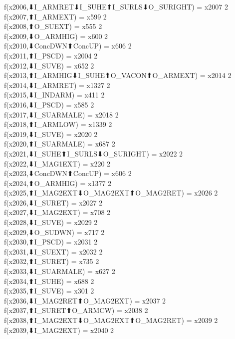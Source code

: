 f(x2006,⬇I_ARMRET⬇I_SUHE⬆I_SURLS⬇O_SURIGHT) = x2007 {2} \\
f(x2007,⬆I_ARMEXT) = x599 {2} \\
f(x2008,⬆O_SUEXT) = x555 {2} \\
f(x2009,⬇O_ARMHIG) = x600 {2} \\
f(x2010,⬇ConcDWN⬆ConcUP) = x606 {2} \\
f(x2011,⬆I_PSCD) = x2004 {2} \\
f(x2012,⬇I_SUVE) = x652 {2} \\
f(x2013,⬆I_ARMHIG⬇I_SUHE⬆O_VACON⬆O_ARMEXT) = x2014 {2} \\
f(x2014,⬇I_ARMRET) = x1327 {2} \\
f(x2015,⬇I_INDARM) = x411 {2} \\
f(x2016,⬇I_PSCD) = x585 {2} \\
f(x2017,⬇I_SUARMALE) = x2018 {2} \\
f(x2018,⬆I_ARMLOW) = x1339 {2} \\
f(x2019,⬇I_SUVE) = x2020 {2} \\
f(x2020,⬆I_SUARMALE) = x687 {2} \\
f(x2021,⬇I_SUHE⬆I_SURLS⬇O_SURIGHT) = x2022 {2} \\
f(x2022,⬇I_MAG1EXT) = x220 {2} \\
f(x2023,⬇ConcDWN⬆ConcUP) = x606 {2} \\
f(x2024,⬆O_ARMHIG) = x1377 {2} \\
f(x2025,⬆I_MAG2EXT⬇O_MAG2EXT⬆O_MAG2RET) = x2026 {2} \\
f(x2026,⬇I_SURET) = x2027 {2} \\
f(x2027,⬇I_MAG2EXT) = x708 {2} \\
f(x2028,⬇I_SUVE) = x2029 {2} \\
f(x2029,⬇O_SUDWN) = x717 {2} \\
f(x2030,⬆I_PSCD) = x2031 {2} \\
f(x2031,⬇I_SUEXT) = x2032 {2} \\
f(x2032,⬆I_SURET) = x735 {2} \\
f(x2033,⬇I_SUARMALE) = x627 {2} \\
f(x2034,⬆I_SUHE) = x688 {2} \\
f(x2035,⬆I_SUVE) = x301 {2} \\
f(x2036,⬇I_MAG2RET⬆O_MAG2EXT) = x2037 {2} \\
f(x2037,⬆I_SURET⬆O_ARMCW) = x2038 {2} \\
f(x2038,⬆I_MAG2EXT⬇O_MAG2EXT⬆O_MAG2RET) = x2039 {2} \\
f(x2039,⬇I_MAG2EXT) = x2040 {2} \\
